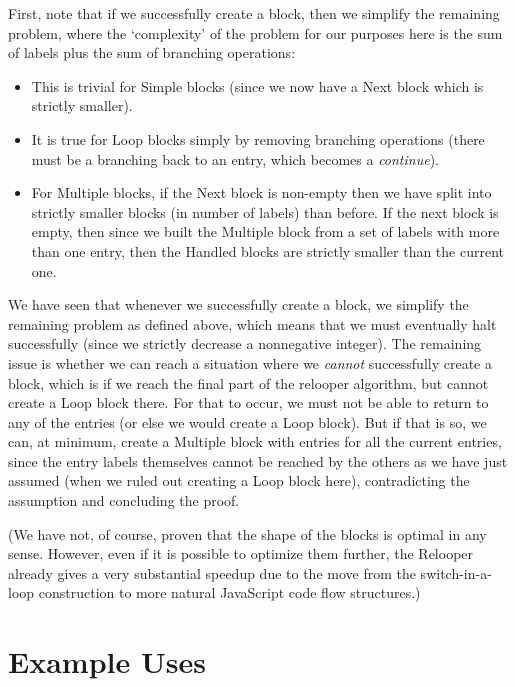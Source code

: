 \documentclass[11pt]{proc}
\begin{document}
First, note that if we
successfully create a block, then we simplify the remaining
problem, where the `complexity' of the problem for our purposes
here is the sum of labels plus the sum of branching operations:
\begin{itemize}
\item This is trivial for Simple blocks (since we now have a Next block
which is strictly smaller).
\item It is true for Loop blocks simply by removing branching
operations (there must be a branching back to an entry, which
becomes a \emph{continue}).
\item For Multiple blocks, if the Next block is non-empty then we have split into strictly
smaller blocks (in number of labels) than before. If the next block
is empty, then since we built the Multiple block from a set of labels
with more than one entry, then the Handled blocks are strictly smaller
than the current one.
\end{itemize}
We have seen that whenever we successfully create a block, we simplify the remaining problem
as defined above, which means that we must eventually halt successfully (since
we strictly decrease a nonnegative integer).
The remaining issue is whether we can reach a situation where we \emph{cannot}
successfully create a block, which is if we reach the final part of the relooper algorithm, but cannot create a
Loop block there. For that to occur, we must not be able
to return to any of the entries (or else we would create a Loop
block). But if that is so, we can, at minimum, create a Multiple
block with entries for all the current entries, since the entry
labels themselves cannot be reached by the others as we have just
assumed (when we ruled out creating a Loop block here), contradicting the assumption
and concluding the proof.

(We have not, of course, proven that the shape of the blocks is optimal
in any sense. However, even if it is possible to optimize them further, the Relooper
already gives a very substantial speedup due to the move from the switch-in-a-loop
construction to more natural JavaScript code flow structures.)

\section{Example Uses}
\end{document}
